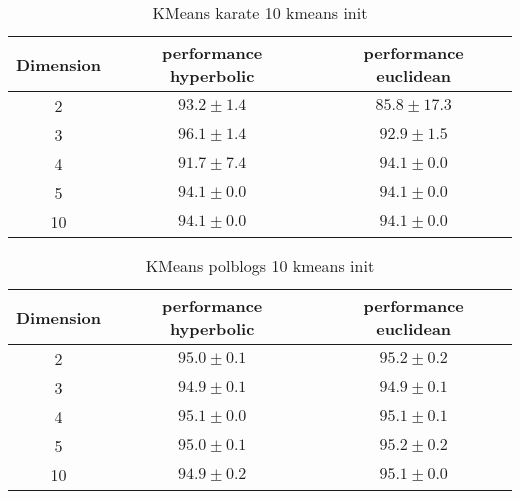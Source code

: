 \documentclass{article}
\begin{document}
\begin{table} 
    \centering
    \begin{tabular}{|c|cc|}

    \hline Dimension & performance hyperbolic & performance euclidean\\ \hline
    2& $93.2 \pm 1.4$ & $85.8 \pm 17.3$\\ \hline
    3& $96.1 \pm 1.4$ & $92.9 \pm 1.5$\\ \hline
    4& $91.7 \pm 7.4$ & $94.1 \pm 0.0$\\ \hline
    5& $94.1 \pm 0.0$ & $94.1 \pm 0.0$\\ \hline
    10& $94.1 \pm 0.0$ & $94.1 \pm 0.0$\\ \hline
    \end{tabular}
\caption{KMeans karate 10 kmeans init}
 \end{table}
\begin{table} 
    \centering 
    \begin{tabular}{|c|cc|}
      \hline Dimension & performance hyperbolic & performance euclidean\\ \hline
      2& $95.0 \pm 0.1$ & $95.2 \pm 0.2$\\ \hline
      3& $94.9 \pm 0.1$ & $94.9 \pm 0.1$\\ \hline
      4& $95.1 \pm 0.0$ & $95.1 \pm 0.1$\\ \hline
      5& $95.0 \pm 0.1$ & $95.2 \pm 0.2$\\ \hline
      10& $94.9 \pm 0.2$ & $95.1 \pm 0.0$\\ \hline
  \end{tabular}

\caption{KMeans polblogs 10 kmeans init}
\end{table}
\end{document}
